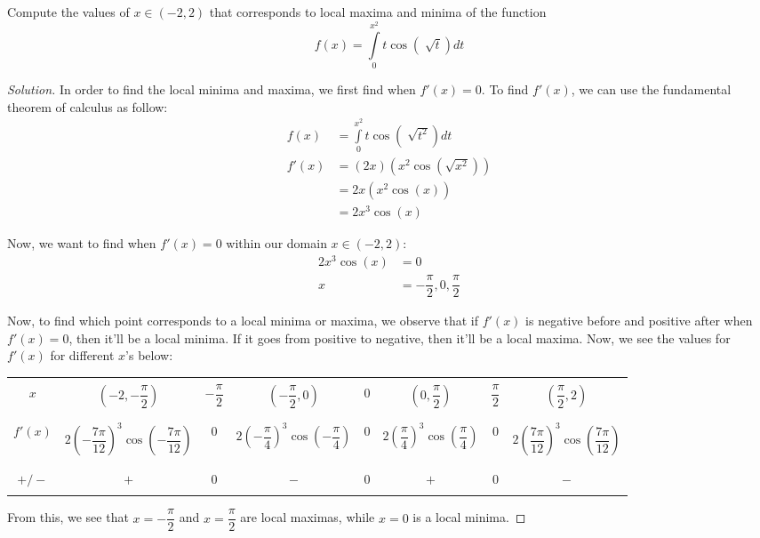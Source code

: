 \documentclass{article}
\newenvironment{solution}{\begin{proof}[Solution]}{\end{proof}}
\let\oldint\int
\renewcommand{\int}[2]{\oldint\limits_{#1}^{#2}}
\begin{document}
\begin{hw}
	Compute the values of $ x \in \left(-2, 2 \right) $ that corresponds to local maxima and minima of the function
	\begin{equation*}
		f(x) = \int{0}{x^{2}} t\cos\left( \sqrt[]{t} \right) dt
	\end{equation*}
\end{hw}
\begin{solution}
	In order to find the local minima and maxima, we first find when $f'(x) = 0$. To find $f'(x)$, we can use the fundamental theorem of calculus as follow:
	\begin{align*}
		f(x) &= \int{0}{x^{2}} t\cos\left( \sqrt[]{t^{2}} \right) dt \\
		f'(x) &= (2x)(x^{2}\cos\left( \sqrt{x^{2}} \right)) \\
		&= 2x(x^{2}\cos\left( x \right)) \\
		&= 2x^{3}\cos\left( x \right)
	\end{align*}

	Now, we want to find when $ f'(x) = 0$ within our domain $x\in(-2, 2)$:
	\begin{align*}
		2x^{3}\cos\left( x \right) &= 0 \\
		x &= -\dfrac{\pi}{2}, 0, \dfrac{\pi}{2}
	\end{align*}

	Now, to find which point corresponds to a local minima or maxima, we observe that if $f'(x)$ is negative before and positive after when $f'(x)=0$, then it'll be a local minima. If it goes from positive to negative, then it'll be a local maxima. Now, we see the values for $f'(x)$ for different $x$'s below:
	
	\begin{center}
		\begin{tabular}{|c|c|c|c|c|c|c|c|}
		\hline
		& & & & & & & \\
		$x$ & $\left( -2, -\dfrac{\pi}{2} \right)$ & $-\dfrac{\pi}{2}$ & $\left( -\dfrac{\pi}{2}, 0 \right)$ & $0$ & $\left( 0, \dfrac{\pi}{2} \right)$ & $\dfrac{\pi}{2}$ & $\left( \dfrac{\pi}{2}, 2 \right)$ \\
		& & & & & & & \\
		\hline
		& & & & & & & \\
		$f'(x)$ & $2\left( -\dfrac{7\pi}{12} \right)^{3}\cos\left( -\dfrac{7\pi}{12} \right)$ & $0$ & $2\left( -\dfrac{\pi}{4} \right)^{3}\cos\left( -\dfrac{\pi}{4} \right)$ & $0$ & $2\left( \dfrac{\pi}{4} \right)^{3}\cos\left( \dfrac{\pi}{4} \right)$ & $0$ & $2\left( \dfrac{7\pi}{12} \right)^{3}\cos\left( \dfrac{7\pi}{12} \right)$ \\
		& & & & & & & \\
		\hline 
		& & & & & & & \\
		$+/-$ & $+$ & $0$ & $-$ & $0$ & $+$ & $0$ & $-$ \\
		& & & & & & & \\
		\hline
	\end{tabular}
	\end{center}

	From this, we see that $x=-\dfrac{\pi}{2}$ and $x=\dfrac{\pi}{2}$ are local maximas, while $x=0$ is a local minima.
\end{solution}
\end{document}
